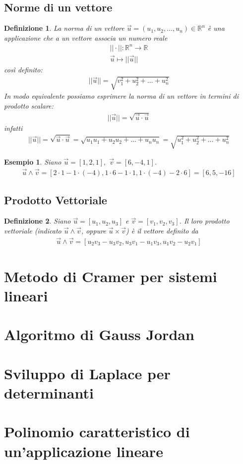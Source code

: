 \documentclass{article}
\newtheorem{defi}{Definizione}[section]
\newtheorem{esempio}{Esempio}[section]
\begin{document}
\subsection{Norme di un vettore}
\label{sec:normVett}
\begin{defi}
  La norma di un vettore $\vec{u}=(u_1,u_2,\dots,u_n)\in \mathds{R}^n$ è una
  applicazione che a un vettore associa un numero reale
  \begin{eqnarray*}
    ||\cdot||: \mathds{R}^n\to \mathds{R}\\
    \vec{u}\mapsto ||\vec{u}||
  \end{eqnarray*}
  così definito:
  \begin{eqnarray*}
    ||\vec{u}||=\sqrt{v_1^2+u_2^2+\dots+u^2_n}
  \end{eqnarray*}
  In modo equivalente possiamo esprimere la norma di un vettore in termini di
  prodotto scalare:
  \begin{eqnarray*}
    ||\vec{u}||=\sqrt{\vec{u}\cdot\vec{u}}
  \end{eqnarray*}
  infatti
  \begin{eqnarray*}
    ||\vec{u}||=\sqrt{\vec{u}\cdot\vec{u}}=\sqrt{u_1u_1+u_2u_2+\dots+u_nu_n}=
    \sqrt{u_1^2+u_2^2+\dots+u_n^2}
  \end{eqnarray*}
\end{defi}
\begin{esempio}
  Siano $\vec{u}=[1,2,1],$ $\vec{v}=[6,-4,1]$.
  \begin{eqnarray*}
    \vec{u}\wedge \vec{v}=[2\cdot 1 -1 \cdot (-4), 1 \cdot 6-1\cdot 1,1\cdot (-4) -2\cdot 6]= [6,5,-16]
  \end{eqnarray*}
\end{esempio}
\subsection{Prodotto Vettoriale}
\label{sec:prodVett}

\begin{defi}
  Siano $\vec{u}=[u_1,u_2,u_3]$ e $\vec{v}=[v_1,v_2,v_3]$. Il loro prodotto
  vettoriale (indicato $\vec{u} \wedge \vec{v}$, oppure $\vec{u}\times \vec{v}$)
  è il vettore definito da
  \begin{eqnarray*}
    \vec{u}\wedge \vec{v}=[u_2v_3-u_3v_2,u_3v_1-u_1v_3,u_1v_2-u_2v_1]
  \end{eqnarray*}
\end{defi}
\section{Metodo di Cramer per sistemi lineari}
\label{sec:Metododicramer}

\section{Algoritmo di Gauss Jordan}
\label{sec:algoritmodigauss}

\section{Sviluppo di Laplace per determinanti}
\label{sec:laplace}

\section{Polinomio caratteristico di un'applicazione lineare}
\label{sec:polinomicaratteristici}
\end{document}
